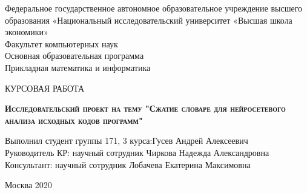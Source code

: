 \begin{titlepage}
\newpage

\begin{center}
Федеральное государственное автономное образовательное учреждение высшего образования «Национальный исследовательский университет «Высшая школа экономики»
\\
\medskip
Факультет компьютерных наук \\
Основная образовательная программа \\
Прикладная математика и информатика \\
\end{center}

\vspace{8em}

\begin{center}
\Large КУРСОВАЯ РАБОТА\\ 
\end{center}

\vspace{2em}

\begin{center}
\textsc{\textbf{
Исследовательский проект на тему
\linebreak
"Сжатие словаре для нейросетевого анализа исходных кодов программ"}}
\end{center}

\vspace{6em}



\newbox{\lbox}
\newlength{\maxl}
\setlength{\maxl}{\wd\lbox}
\hfill\parbox{17cm}{
\hspace*{5cm}\hspace*{-5cm}Выполнил студент группы 171, 3 курса:\hfill Гусев Андрей Алексеевич\\
\hspace*{5cm}\hspace*{-5cm}Руководитель КР:\hfill 
научный сотрудник Чиркова Надежда Александровна\\
\hspace*{5cm}\hspace*{-5cm}Консультант:\hfill 
научный сотрудник Лобачева Екатерина Максимовна\\
}


\vspace{\fill}

\begin{center}
Москва 2020
\end{center}

\end{titlepage}